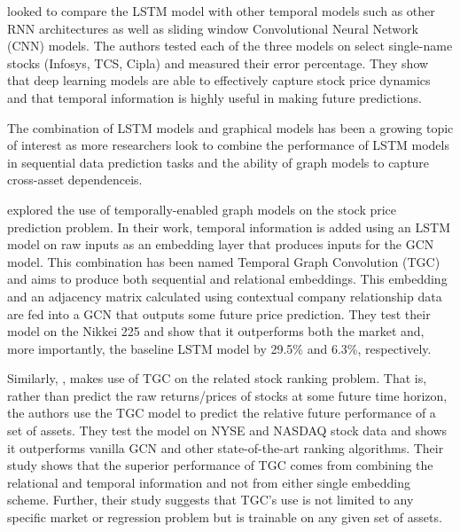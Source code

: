 \cite{Selvin2017} looked to compare the LSTM model with other temporal models such as other RNN architectures as well as sliding window Convolutional Neural Network (CNN) models. The authors tested each of the three models on select single-name stocks (Infosys, TCS, Cipla) and measured their error percentage. They show that deep learning models are able to effectively capture stock price dynamics and that temporal information is highly useful in making future predictions.

The combination of LSTM models and graphical models has been a growing topic of interest as more researchers look to combine the performance of LSTM models in sequential data prediction tasks and the ability of graph models to capture cross-asset dependenceis.


\cite{Matsunaga2019} explored the use of temporally-enabled graph models on the stock price prediction problem. In their work, temporal information is added using an LSTM model on raw inputs as an embedding layer that produces inputs for the GCN model. This combination has been named Temporal Graph Convolution (TGC) and aims to produce both sequential and relational embeddings. This embedding and an adjacency matrix calculated using contextual company relationship data are fed into a GCN that outputs some future price prediction. They test their model on the Nikkei 225 and show that it outperforms both the market and, more importantly, the baseline LSTM model by 29.5\% and 6.3\%, respectively.

Similarly, \cite{Feng2019}, makes use of TGC on the related stock ranking problem. That is, rather than predict the raw returns/prices of stocks at some future time horizon, the authors use the TGC model to predict the relative future performance of a set of assets. They test the model on NYSE and NASDAQ stock data and shows it outperforms vanilla GCN and other state-of-the-art ranking algorithms. Their study shows that the superior performance of TGC comes from combining the relational and temporal information and not from either single embedding scheme. Further, their study suggests that TGC's use is not limited to any specific market or regression problem but is trainable on any given set of assets.

